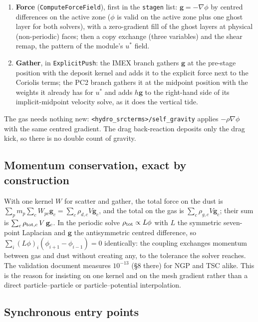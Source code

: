 \documentclass[11pt]{article}
\newcommand{\code}[1]{\texttt{#1}}
\newcommand{\fn}[1]{\texttt{\small #1}}
\begin{document}
\begin{enumerate}
\item \textbf{Force} (\fn{ComputeForceField}), first in the \code{stagen} list:
      $\mathbf g = -\nabla\phi$ by centred differences on the active zone ($\phi$ is
      valid on the active zone plus one ghost layer for both solvers), with a
      zero-gradient fill of the ghost layers at physical (non-periodic) faces; then a
      copy exchange (three variables) and the shear remap, the pattern of the module's
      $u^*$ field.
\item \textbf{Gather}, in \fn{ExplicitPush}: the IMEX branch gathers $\mathbf g$ at the
      pre-stage position with the deposit kernel and adds it to the explicit force
      next to the Coriolis terms; the PC2 branch gathers it at the midpoint position
      with the weights it already has for $u^*$ and adds $h\mathbf g$ to the right-hand
      side of its implicit-midpoint velocity solve, as it does the vertical tide.
\end{enumerate}

The gas needs nothing new: \code{<hydro\_srcterms>/self\_gravity} applies
$-\rho\nabla\phi$ with the same centred gradient. The drag back-reaction deposits only
the drag kick, so there is no double count of gravity.

\subsection{Momentum conservation, exact by construction}

With one kernel $W$ for scatter and gather, the total force on the dust is
$\sum_p m_p\sum_c W_{pc}\mathbf g_c = \sum_c \rho_{d,c}V\mathbf g_c$, and the total on the
gas is $\sum_c \rho_{g,c}V\mathbf g_c$; their sum is
$\sum_c \rho_{{\rm tot},c}\,V\,\mathbf g_c$. In the periodic solve
$\rho_{\rm tot} \propto L\phi$ with $L$ the symmetric seven-point Laplacian and
$\mathbf g$ the antisymmetric centred difference, so
$\sum_i (L\phi)_i(\phi_{i+1} - \phi_{i-1}) = 0$ identically: the coupling exchanges
momentum between gas and dust without creating any, to the tolerance the solver
reaches. The validation document measures $10^{-13}$ (\S8 there) for NGP and TSC alike.
This is the reason for insisting on one kernel and on the mesh gradient rather than a
direct particle--particle or particle--potential interpolation.

\subsection{Synchronous entry points}
\end{document}
